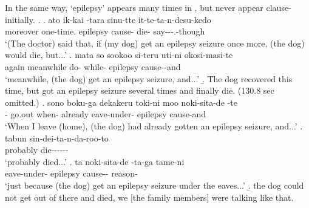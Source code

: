 In the same way,
 `epilepsy' appears many times in \Next,
but never appear clause-initially.
%
\ex.\label{WO:ClauseInit:Given:tenkan}
 \ag. ato ik-kai  -tara sinu-tte it-te-ta-n-desu-kedo \\
      moreover one-time. epilepsy cause- die- say---.-though \\
      `(The doctor) said that, if (my dog) get an epilepsy seizure once more, (the dog) would die, but...'
 \bg. mata so sookoo si-teru uti-ni  okosi-masi-te \\
      again  meanwhile do- while- epilepsy cause--and \\
      `meanwhile, (the dog) get an epilepsy seizure, and...'
 \b. The dog recovered this time, but got an epilepsy seizure several times and finally die. (130.8 sec omitted.)
 \bg. sono boku-ga dekakeru toki-ni moo noki-sita-de  -te \\
       - go.out when- already eave-under- epilepsy cause-and \\
      `When I leave (home), (the dog) had already gotten an epilepsy seizure, and...'
 \bg. tabun sin-dei-ta-n-da-roo-to \\
      probably die------\\
      `probably died...'
 \bg. ta noki-sita-de  -ta-ga tame-ni \\
       eave-under- epilepsy cause-- reason- \\
      `just because (the dog) get an epilepsy seizure under the eaves...'
 \b. the dog could not get out of there and died, we [the family members] were talking like that.


